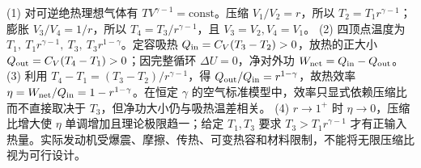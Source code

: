 (1) 对可逆绝热理想气体有 \(TV^{\gamma-1}=\mathrm{const}\)。压缩 \(V_1/V_2=r\)，所以 \(T_2=T_1r^{\gamma-1}\)；膨胀 \(V_3/V_4=1/r\)，所以 \(T_4=T_3/r^{\gamma-1}\)，且 \(V_3=V_2,V_4=V_1\)。
(2) 四顶点温度为 \(T_1,\ T_1r^{\gamma-1},\ T_3,\ T_3r^{1-\gamma}\)。定容吸热 \(Q_{\rm in}=C_V(T_3-T_2)>0\)，放热的正大小 \(Q_{\rm out}=C_V(T_4-T_1)>0\)；因完整循环 \(\Delta U=0\)，净对外功 \(W_{\rm net}=Q_{\rm in}-Q_{\rm out}\)。
(3) 利用 \(T_4-T_1=(T_3-T_2)/r^{\gamma-1}\)，得 \(Q_{\rm out}/Q_{\rm in}=r^{1-\gamma}\)，故热效率 \(\eta=W_{\rm net}/Q_{\rm in}=1-r^{1-\gamma}\)。在恒定 \(\gamma\) 的空气标准模型中，效率只显式依赖压缩比而不直接取决于 \(T_3\)，但净功大小仍与吸热温差相关。
(4) \(r\to1^+\) 时 \(\eta\to0\)，压缩比增大使 \(\eta\) 单调增加且理论极限趋一；给定 \(T_1,T_3\) 要求 \(T_3>T_1r^{\gamma-1}\) 才有正输入热量。实际发动机受爆震、摩擦、传热、可变热容和材料限制，不能将无限压缩比视为可行设计。

